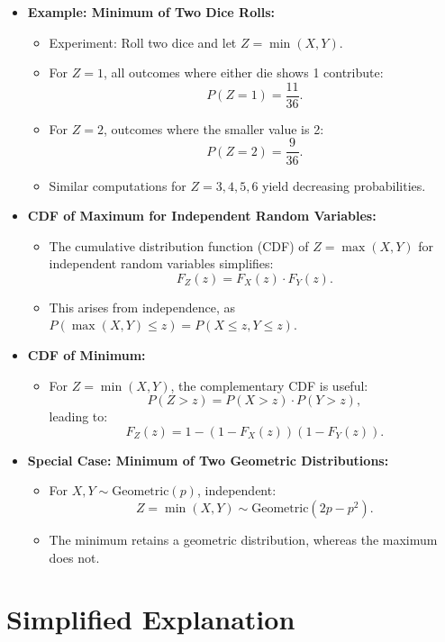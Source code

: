 \documentclass{article}
\begin{document}
\begin{itemize}
  \item \textbf{Example: Minimum of Two Dice Rolls:}
    \begin{itemize}
      \item Experiment: Roll two dice and let $Z = \min(X, Y)$.
      \item For $Z = 1$, all outcomes where either die shows 1 contribute:
        \[
          P(Z = 1) = \frac{11}{36}.
        \]
      \item For $Z = 2$, outcomes where the smaller value is 2:
        \[
          P(Z = 2) = \frac{9}{36}.
        \]
      \item Similar computations for $Z = 3, 4, 5, 6$ yield decreasing probabilities.
    \end{itemize}

  \item \textbf{CDF of Maximum for Independent Random Variables:}
    \begin{itemize}
      \item The cumulative distribution function (CDF) of $Z = \max(X, Y)$ for independent random variables simplifies:
        \[
          F_Z(z) = F_X(z) \cdot F_Y(z).
        \]
      \item This arises from independence, as $P(\max(X, Y) \leq z) = P(X \leq z, Y \leq z)$.
    \end{itemize}

  \item \textbf{CDF of Minimum:}
    \begin{itemize}
      \item For $Z = \min(X, Y)$, the complementary CDF is useful:
        \[
          P(Z > z) = P(X > z) \cdot P(Y > z),
        \]
        leading to:
        \[
          F_Z(z) = 1 - (1 - F_X(z))(1 - F_Y(z)).
        \]
    \end{itemize}

  \item \textbf{Special Case: Minimum of Two Geometric Distributions:}
    \begin{itemize}
      \item For $X, Y \sim \text{Geometric}(p)$, independent:
        \[
          Z = \min(X, Y) \sim \text{Geometric}(2p - p^2).
        \]
      \item The minimum retains a geometric distribution, whereas the maximum does not.
    \end{itemize}
\end{itemize}

\section*{Simplified Explanation}
\end{document}
